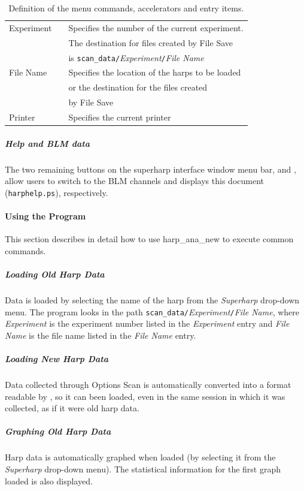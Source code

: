 \begin{table}
\begin{center}
\begin{tabular}{||l|c|l||}
Experiment	& & Specifies the number of the current experiment.	\\
		& & The destination for files created by File Save 	\\
		& & is {\tt scan\_data/}{\it{Experiment}}{\tt /}{\it File Name}	\\
File Name	& & Specifies the location of the harps to be loaded	\\
		& & or the destination for the files created			\\
		& & by File Save			\\
Printer		& & Specifies the current printer				\\
\hline
\hline
\end{tabular}
	\caption{Definition of the menu commands, accelerators and entry items.}\label{table:menu_entry}
\end{center}
\end{table}

	\subparagraph{Help and BLM data}

The two remaining buttons on the superharp interface window menu bar,  and
, allow users to switch to the BLM channels and displays this document ({\tt harphelp.ps}),
respectively.

\paragraph{Using the Program}\label{program}

This section describes in detail how to use harp\_ana\_new to execute common commands.

	\subparagraph{Loading Old Harp Data}

Data is loaded by selecting the name of the harp from the {\it Superharp} drop-down menu.  The program
looks in the path {\tt scan\_data/}{\it Experiment}{\tt /}{\it File Name}, where {\it Experiment} is
the experiment number listed in the {\it Experiment} entry and {\it File Name} is the file name listed
in the {\it File Name} entry.

	\subparagraph{Loading New Harp Data}

Data collected through Options Scan is automatically converted into a format readable by
{}, so it can been loaded, even in the same session in which it was collected,
as if it were old harp data.

	\subparagraph{Graphing Old Harp Data}

Harp data is automatically graphed when loaded (by selecting it from the {\it Superharp} drop-down menu).
The statistical information for the first graph loaded is also displayed.

